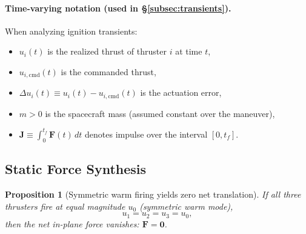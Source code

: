 \documentclass{article}
\newtheorem{proposition}{Proposition}
\begin{document}
\paragraph{Time-varying notation (used in \S\ref{subsec:transients}).}
When analyzing ignition transients:
\begin{itemize}
\item $u_i(t)$ is the realized thrust of thruster $i$ at time $t$,
\item $u_{i,\mathrm{cmd}}(t)$ is the commanded thrust,
\item $\Delta u_i(t) \equiv u_i(t) - u_{i,\mathrm{cmd}}(t)$ is the actuation error,
\item $m > 0$ is the spacecraft mass (assumed constant over the maneuver),
\item $\mathbf J \equiv \int_0^{t_f} \mathbf F(t)\,dt$ denotes impulse over the interval $[0, t_f]$.
\end{itemize}


\subsection{Static Force Synthesis}

\begin{proposition}[Symmetric warm firing yields zero net translation]
\label{prop:warm_zero_force}
If all three thrusters fire at equal magnitude $u_0$ (symmetric warm mode),
\begin{equation}
u_1 = u_2 = u_3 = u_0,
\end{equation}
then the net in-plane force vanishes: $\mathbf F = \mathbf 0$.
\end{proposition}
\end{document}
